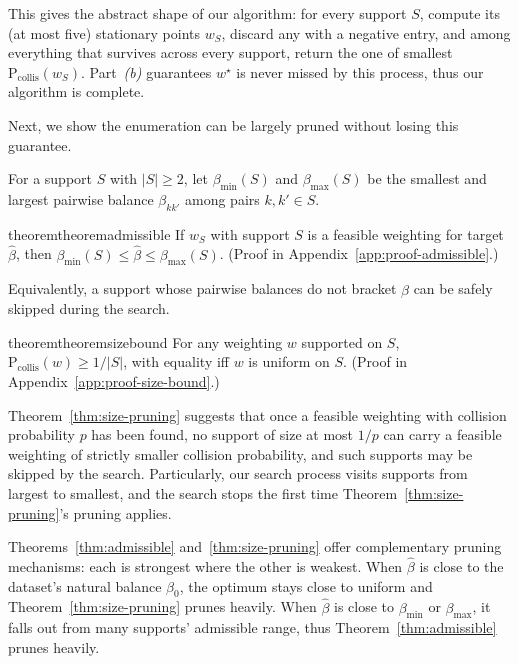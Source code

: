 \documentclass[11pt]{article}
\makeatletter
\newcommand{\qualification}[1]{\ifthmt@thisistheone#1\fi}
\makeatother
\begin{document}
This gives the abstract shape of our algorithm: for every support $S$, compute its (at most five) stationary points $w_S$, discard any with a negative entry, and among everything that survives across every support, return the one of smallest $\mathrm{P}_\mathrm{collis}(w_S)$. Part~\textit{(b)} guarantees $w^\star$ is never missed by this process, thus our algorithm is complete.

Next, we show the enumeration can be largely pruned without losing this guarantee.

For a support $S$ with $|S|{\ge}2$, let $\beta_{\min}(S)$ and $\beta_{\max}(S)$ be the smallest and largest pairwise balance $\beta_{kk'}$ among pairs $k,k'\in S$.

\begin{restatable}{theorem}{theoremadmissible}
\label{thm:admissible}
If $w_S$ with support $S$ is a feasible weighting for target $\hat\beta$, then $\beta_{\min}(S) \le \hat\beta \le \beta_{\max}(S)$. \qualification{ (Proof in Appendix~\ref{app:proof-admissible}.)}
\end{restatable}


Equivalently, a support whose pairwise balances do not bracket $\hat\beta$ can be safely skipped during the search.

\begin{restatable}{theorem}{theoremsizebound}
\label{thm:size-pruning}
For any weighting $w$ supported on $S$, $\mathrm{P}_\mathrm{collis}(w) \ge 1/|S|$, with equality iff $w$ is uniform on $S$. \qualification{ (Proof in Appendix~\ref{app:proof-size-bound}.)}
\end{restatable}

Theorem~\ref{thm:size-pruning} suggests that once a feasible weighting with collision probability $p$ has been found, no support of size at most $1/p$ can carry a feasible weighting of strictly smaller collision probability, and such supports may be skipped by the search. Particularly, our  search process visits supports from largest to smallest, and the search stops the first time Theorem~\ref{thm:size-pruning}'s pruning applies.

Theorems~\ref{thm:admissible} and~\ref{thm:size-pruning} offer complementary pruning mechanisms: each is strongest where the other is weakest. When $\hat\beta$ is close to the dataset's natural balance $\beta_0$, the optimum stays close to uniform and Theorem~\ref{thm:size-pruning} prunes heavily. When $\hat\beta$ is close to $\beta_{\min}$ or $\beta_{\max}$, it falls out from many supports' admissible range, thus Theorem~\ref{thm:admissible} prunes heavily.
\end{document}
